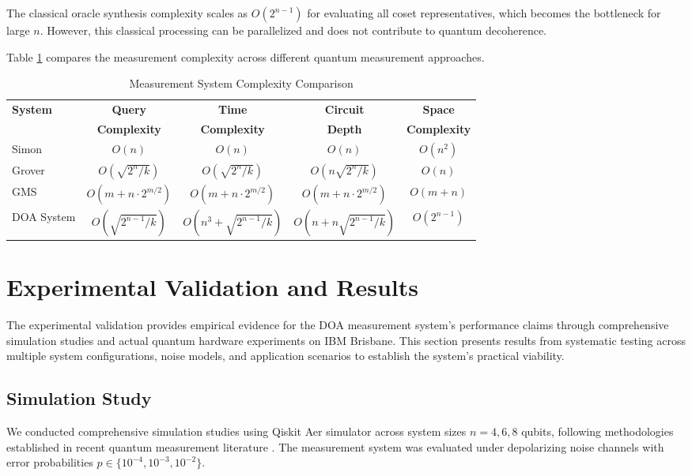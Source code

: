 \documentclass[journal]{IEEEtran}
\begin{document}
The classical oracle synthesis complexity scales as $O(2^{n-1})$ for evaluating all coset representatives, which becomes the bottleneck for large $n$. However, this classical processing can be parallelized and does not contribute to quantum decoherence.

Table \ref{tab:complexity} compares the measurement complexity across different quantum measurement approaches.

\begin{table}[htbp]
\caption{Measurement System Complexity Comparison}
\label{tab:complexity}
\centering
\begin{tabular}{|l|c|c|c|c|}
\hline
\textbf{System} & \textbf{Query} & \textbf{Time} & \textbf{Circuit} &\textbf{Space} \\
 & \textbf{Complexity} & \textbf{Complexity} & \textbf{Depth} &\textbf{Complexity} \\
\hline
Simon & $O(n)$ & $O(n)$ & $O(n)$ & $O(n^2)$\\
\hline
Grover & $O(\sqrt{2^n/k})$ & $O(\sqrt{2^n/k})$ & $O(n\sqrt{2^n/k})$ & $O(n)$\\
\hline
GMS & $O(m + n \cdot 2^{m/2})$ & $O(m + n \cdot 2^{m/2})$ & $O(m + n \cdot 2^{m/2})$ & $O(m + n)$ \\
\hline
{DOA System} & {$O(\sqrt{2^{n-1}/k})$} & {$O(n^3 + \sqrt{2^{n-1}/k})$} & {$O(n + n\sqrt{2^{n-1}/k})$} & {$O(2^{n-1})$}\\
\hline
\end{tabular}
\end{table}

\section{Experimental Validation and Results}

The experimental validation provides empirical evidence for the DOA measurement system's performance claims through comprehensive simulation studies and actual quantum hardware experiments on IBM Brisbane. This section presents results from systematic testing across multiple system configurations, noise models, and application scenarios to establish the system's practical viability.

\subsection{Simulation Study}

We conducted comprehensive simulation studies using Qiskit Aer simulator across system sizes $n=4, 6, 8$ qubits, following methodologies established in recent quantum measurement literature \cite{AbuGhanem:2024vwb, 10590348}. The measurement system was evaluated under depolarizing noise channels with error probabilities $p \in \{10^{-4}, 10^{-3}, 10^{-2}\}$.
\end{document}
